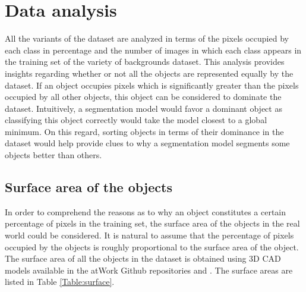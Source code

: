 \section{Data analysis}
\label{section:analysis}

	All the variants of the dataset are analyzed in terms of the pixels occupied by each class in percentage and the number of images in which each class appears in the training set of the variety of backgrounds dataset. This analysis provides insights regarding whether or not all the objects are represented equally by the dataset. If an object occupies pixels which is significantly greater than the pixels occupied by all other objects, this object can be considered to dominate the dataset. Intuitively, a segmentation model would favor a dominant object as classifying this object correctly would take the model closest to a global minimum. On this regard, sorting objects in terms of their dominance in the dataset would help provide clues to why a segmentation model segments some objects better than others. 
	
	\subsection{Surface area of the objects}
		
		In order to comprehend the reasons as to why an object constitutes a certain percentage of pixels in the training set, the surface area of the objects in the real world could be considered. It is natural to assume that the percentage of pixels occupied by the objects is roughly proportional to the surface area of the object. The surface area of all the objects in the dataset is obtained using 3D CAD models available in the atWork Github repositories \cite{atwork_models} and \cite{atwork_models_rockin}. The surface areas are listed in Table \ref{Table:surface}.
		
